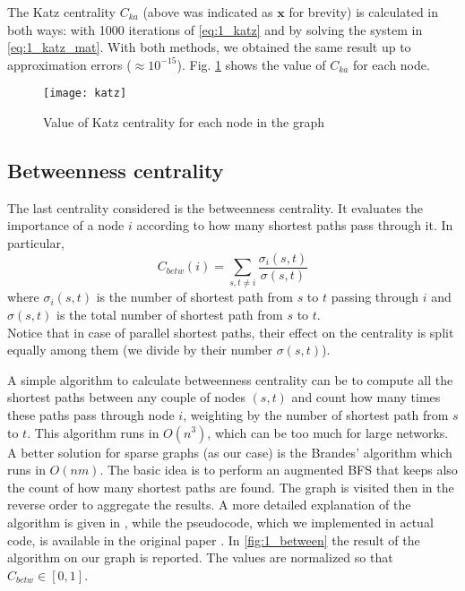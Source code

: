 The Katz centrality $C_{ka}$ (above was indicated as $\mathbf{x}$ for brevity) is calculated in both ways: with 1000 iterations of \cref{eq:1_katz} and by solving the system in \cref{eq:1_katz_mat}. With both methods, we obtained the same result up to approximation errors ($\approx 10^{-15}$). Fig. \ref{fig:1_katz_centrality} shows the value of $C_{ka}$ for each node.

\begin{figure} [!ht]
	\centering
	\texttt{[image: katz]}
	\caption{Value of Katz centrality for each node in the graph}
	\label{fig:1_katz_centrality}
\end{figure}


\subsection{Betweenness centrality}

The last centrality considered is the betweenness centrality. It evaluates the importance of a node $i$ according to how many shortest paths pass through it. In particular,
\begin{equation}\label{eq:1_betw}
C_{betw}(i)= \sum_{s,t \neq i}{\frac{\sigma_i(s,t)}{\sigma(s,t)}}
\end{equation}
where $\sigma_i(s,t)$ is the number of shortest path from $s$ to $t$ passing through $i$ and  $\sigma(s,t)$ is the total number of shortest path from $s$ to $t$.\\
Notice that in case of parallel shortest paths, their effect on the centrality is split equally among them (we divide by their number $\sigma(s,t)$).

A simple algorithm to calculate betweenness centrality can be to compute all the shortest paths between any couple of nodes $(s,t)$ and count how many times these paths pass through node $i$, weighting by the number of shortest path from $s$ to $t$. This algorithm runs in $O(n^3)$, which can be too much for large networks.\\
A better solution for sparse graphs (as our case) is the Brandes' algorithm which runs in $O(n m)$. The basic idea is to perform an augmented BFS that keeps also the count of how many shortest paths are found. The graph is visited then in the reverse order to aggregate the results. A more detailed explanation of the algorithm is given in \cite{brandes_slides}, while the pseudocode, which we implemented in actual code, is available in the original paper \cite{brandes}.
In \cref{fig:1_between} the result of the algorithm on our graph is reported. The values are normalized so that $C_{betw} \in [0,1]$.

